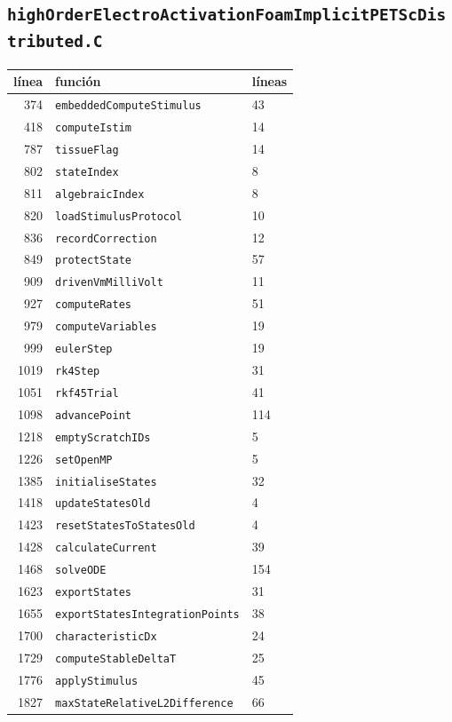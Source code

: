 \documentclass[11pt,a4paper]{article}
\begin{document}
\subsection*{\texttt{highOrderElectroActivationFoamImplicitPETScDistributed.C}}
\begin{longtable}{rll}
\toprule
línea & función & líneas \\
\midrule
\endhead
374 & \texttt{embeddedComputeStimulus} & 43 \\
418 & \texttt{computeIstim} & 14 \\
787 & \texttt{tissueFlag} & 14 \\
802 & \texttt{stateIndex} & 8 \\
811 & \texttt{algebraicIndex} & 8 \\
820 & \texttt{loadStimulusProtocol} & 10 \\
836 & \texttt{recordCorrection} & 12 \\
849 & \texttt{protectState} & 57 \\
909 & \texttt{drivenVmMilliVolt} & 11 \\
927 & \texttt{computeRates} & 51 \\
979 & \texttt{computeVariables} & 19 \\
999 & \texttt{eulerStep} & 19 \\
1019 & \texttt{rk4Step} & 31 \\
1051 & \texttt{rkf45Trial} & 41 \\
1098 & \texttt{advancePoint} & 114 \\
1218 & \texttt{emptyScratchIDs} & 5 \\
1226 & \texttt{setOpenMP} & 5 \\
1385 & \texttt{initialiseStates} & 32 \\
1418 & \texttt{updateStatesOld} & 4 \\
1423 & \texttt{resetStatesToStatesOld} & 4 \\
1428 & \texttt{calculateCurrent} & 39 \\
1468 & \texttt{solveODE} & 154 \\
1623 & \texttt{exportStates} & 31 \\
1655 & \texttt{exportStatesIntegrationPoints} & 38 \\
1700 & \texttt{characteristicDx} & 24 \\
1729 & \texttt{computeStableDeltaT} & 25 \\
1776 & \texttt{applyStimulus} & 45 \\
1827 & \texttt{maxStateRelativeL2Difference} & 66 \\

\end{longtable}
\end{document}

